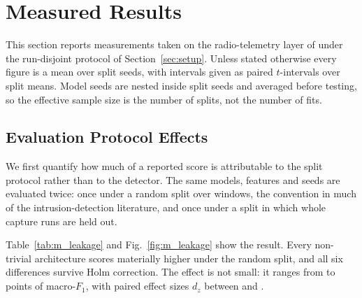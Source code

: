 %
%
%

\section{Measured Results}
\label{sec:measured}

This section reports measurements taken on the radio-telemetry layer of
\DA{} under the run-disjoint protocol of Section~\ref{sec:setup}. Unless
stated otherwise every figure is a mean over  split seeds,
with intervals given as paired $t$-intervals over split means. Model
seeds are nested inside split seeds and averaged before testing, so the
effective sample size is the number of splits, not the number of fits.

\subsection{Evaluation Protocol Effects}
\label{sec:measured:leakage}

We first quantify how much of a reported score is attributable to the
split protocol rather than to the detector. The same models, features and
seeds are evaluated twice: once under a random split over windows, the
convention in much of the intrusion-detection literature, and once under a
split in which whole capture runs are held out.

\begin{table}[t]
\caption{Effect of the split protocol on macro-$F_{1}$, \DA{} radio layer.
Differences are paired over  split seeds; $^{\ast}$ marks
significance after Holm correction within the family of eight models.}
\label{tab:m_leakage}
\centering

\end{table}

Table~\ref{tab:m_leakage} and Fig.~\ref{fig:m_leakage} show the result. Every
non-trivial architecture scores materially higher under the random split,
and all six differences survive Holm correction. The effect is not small:
it ranges from  to  points of macro-$F_{1}$,
with paired effect sizes $d_{z}$ between  and
.

